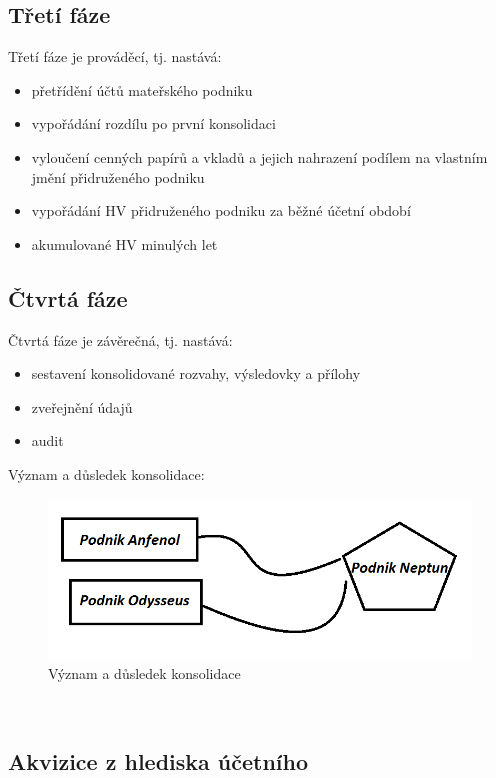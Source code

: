 \documentclass[12pt]{article}
\begin{document}
\subsection{Třetí fáze}
Třetí fáze je prováděcí, tj. nastává:

\begin{itemize}
\item přetřídění účtů mateřského podniku
\item vypořádání rozdílu po první konsolidaci
\item vyloučení cenných papírů a vkladů a jejich nahrazení podílem na vlastním jmění přidruženého podniku
\item vypořádání HV přidruženého podniku za běžné účetní období
\item akumulované HV minulých let
\end{itemize}


\subsection{Čtvrtá fáze}
Čtvrtá fáze je závěrečná, tj. nastává:

\begin{itemize}
\item sestavení konsolidované rozvahy, výsledovky a přílohy
\item zveřejnění údajů
\item audit
\end{itemize}


Význam a důsledek konsolidace:
\\
\begin{figure}[h]
\begin{center}
	\caption{Význam a důsledek konsolidace}
		\label{figure:vyznam-dusledek}
		\includegraphics[scale=0.8]{pics/1-vyznam-dusledek.png}
	\end{center}
\end{figure}
\\
\subsection{Akvizice z hlediska účetního}
\end{document}

